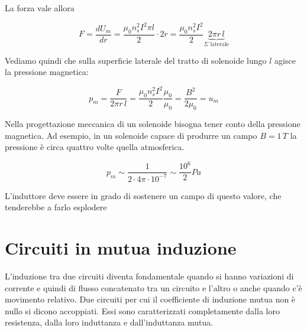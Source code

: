 La forza vale allora

\[
	F = \frac{dU_m}{dr} = \frac{\mu_0 n_s^2 I^2 \pi l}{2} \cdot 2r = \frac{\mu_0 n_s^2 I^2}{2} \underbrace{2\pi r\,l}_{\Sigma \text{ laterale}}
\]

Vediamo quindi che sulla superficie laterale del tratto di solenoide lungo $l$ agisce la pressione magnetica:

\[
	p_m = \frac{F}{2\pi r\,l} = \frac{\mu_0 n_s^2 I^2}{2} \frac{\mu_0}{\mu_0} = \frac{B^2}{2\mu_0}= u_m
\]

Nella progettazione meccanica di un solenoide bisogna tener conto della pressione magnetica. Ad esempio, in un solenoide capace di produrre un campo $B=1\,T$ la pressione è circa quattro volte quella atmosferica.

\[
	p_m \sim \frac{1}{2\cdot 4\pi \cdot 10^{-7}} \sim \frac{10^6}{2} Pa
\]

L'induttore deve essere in grado di sostenere un campo di questo valore, che tenderebbe a farlo esplodere

\section{Circuiti in mutua induzione}

L'induzione tra due circuiti diventa fondamentale quando si hanno variazioni di corrente e quindi di flusso concatenato tra un circuito e l'altro o anche quando c'è movimento relativo. Due circuiti per cui il coefficiente di induzione mutua non è nullo si dicono accoppiati. Essi sono caratterizzati completamente dalla loro resistenza, dalla loro induttanza e dall'induttanza mutua.

